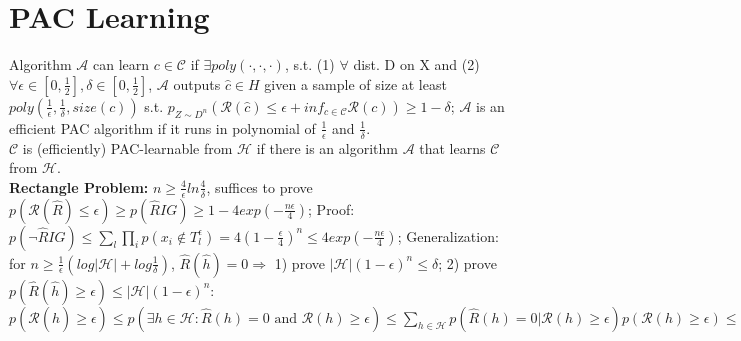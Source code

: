 \section{PAC Learning}
Algorithm $\mathcal{A}$ can learn $c \in \mathcal{C}$ if $\exists poly(\cdot,\cdot,\cdot)$, s.t. (1) $\forall$ dist. D on X and (2) $\forall \epsilon \in [0,\frac{1}{2}], \delta \in [0,\frac{1}{2}]$, $\mathcal{A}$ outputs $\hat{c} \in H$ given a sample of size at least $poly(\frac{1}{\epsilon},\frac{1}{\delta}, size(c))$ s.t. $p_{Z\sim D^n}(\mathcal{R}(\hat{c}) \leq \epsilon + inf_{c\in \mathcal{C}}\mathcal{R}(c)) \geq 1 - \delta$; $\mathcal{A}$ is an efficient PAC algorithm if it runs in polynomial of $\frac{1}{\epsilon}$ and $\frac{1}{\delta}$. \\
$\mathcal{C}$ is (efficiently) PAC-learnable from $\mathcal{H}$ if there is an algorithm $\mathcal{A}$ that learns
$\mathcal{C}$ from $\mathcal{H}$. \\
\textbf{Rectangle Problem: } $n \geq \frac{4}{\epsilon}ln\frac{4}{\delta}$, suffices to prove $p(\mathcal{R}(\hat{R})\leq \epsilon) \geq p(\hat{R}IG) \geq 1-4exp(-\frac{n\epsilon}{4})$; Proof: $p(\text{¬} \hat{R}IG)\leq \sum_l \prod_i p(x_i \notin T_{l}^{\epsilon}) = 4(1-\frac{\epsilon}{4})^n \leq 4exp(-\frac{n\epsilon}{4})$; Generalization: for $n \geq \frac{1}{\epsilon}(log|\mathcal{H}|+log\frac{1}{\delta})$, $\hat{R}(\hat{h}) = 0 \Rightarrow$ 1) prove $|\mathcal{H}|(1-\epsilon)^n \leq \delta$; 2) prove $p(\hat{R}(\hat{h}) \geq \epsilon) \leq |\mathcal{H}|(1-\epsilon)^n$: $p(\mathcal{R}(\hat{h}) \geq \epsilon) \leq p(\exists h \in \mathcal{H}: \hat{R}(h) = 0 \text{ and } \mathcal{R}(h) \geq \epsilon) \leq \sum_{h\in \mathcal{H}} p(\hat{R}(h) = 0 | \mathcal{R}(h) \geq \epsilon) p(\mathcal{R}(h) \geq \epsilon) \leq \sum_{h} p(\hat{R}(h) = 0 | \mathcal{R}(h) \geq \epsilon) \leq \sum_{h} (1-\epsilon)^n$

